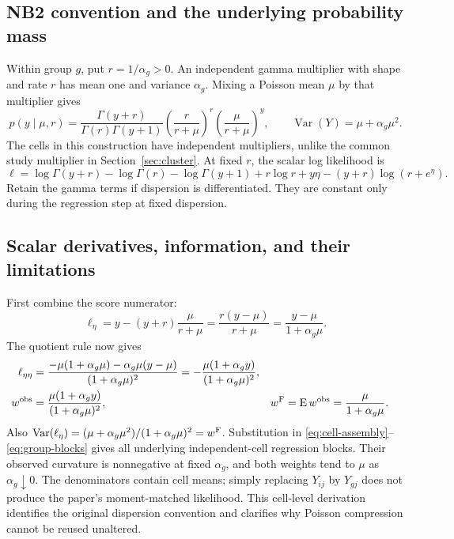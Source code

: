 \documentclass[11pt,a4paper]{article}
\newcommand{\E}{\operatorname{E}}
\newcommand{\Var}{\operatorname{Var}}
\numberwithin{equation}{section}
\begin{document}
\subsection{NB2 convention and the underlying probability mass}
Within group $g$, put $r=1/\alpha_g>0$.
An independent gamma multiplier with shape and rate $r$ has mean one
and variance $\alpha_g$. Mixing a Poisson mean $\mu$ by that multiplier
gives
\begin{equation}
 p(y\mid\mu,r)=\frac{\Gamma(y+r)}{\Gamma(r)\Gamma(y+1)}
       \left(\frac{r}{r+\mu}\right)^r
       \left(\frac{\mu}{r+\mu}\right)^y,
 \qquad \Var(Y)=\mu+\alpha_g\mu^2.
 \label{eq:nb-pmf}
\end{equation}
The cells in this construction have independent multipliers, unlike
the common study multiplier in Section~\ref{sec:cluster}.
At fixed $r$, the scalar log likelihood is
\begin{equation}
 \ell=\log\Gamma(y+r)-\log\Gamma(r)-\log\Gamma(y+1)
       +r\log r+y\eta-(y+r)\log(r+e^\eta).
\end{equation}
Retain the gamma terms if dispersion is differentiated.
They are constant only during the regression step at fixed dispersion.

\subsection{Scalar derivatives, information, and their limitations}
First combine the score numerator:
\begin{equation}
 \ell_\eta=y-(y+r)\frac{\mu}{r+\mu}
 =\frac{r(y-\mu)}{r+\mu}=\frac{y-\mu}{1+\alpha_g\mu}.
\end{equation}
The quotient rule now gives
\begin{align}
 \ell_{\eta\eta}
 &=\frac{-\mu(1+\alpha_g\mu)-\alpha_g\mu(y-\mu)}
                  {(1+\alpha_g\mu)^2}
 =-\frac{\mu(1+\alpha_gy)}{(1+\alpha_g\mu)^2},\\
 w^{\rm obs}&=\frac{\mu(1+\alpha_gy)}{(1+\alpha_g\mu)^2},&
 w^{\rm F}&=\E w^{\rm obs}=\frac{\mu}{1+\alpha_g\mu}. \label{eq:nb-weights}
\end{align}
Also $\Var(\ell_\eta)=(\mu+\alpha_g\mu^2)/(1+\alpha_g\mu)^2=w^{\rm F}$.
Substitution in \eqref{eq:cell-assembly}--\eqref{eq:group-blocks}
gives all underlying independent-cell regression blocks.
Their observed curvature is nonnegative at fixed $\alpha_g$,
and both weights tend to $\mu$ as $\alpha_g\downarrow0$.
The denominators contain cell means; simply replacing $Y_{ij}$ by
$Y_{gj}$ does not produce the paper's moment-matched likelihood.
This cell-level derivation identifies the original dispersion convention
and clarifies why Poisson compression cannot be reused unaltered.
\end{document}
